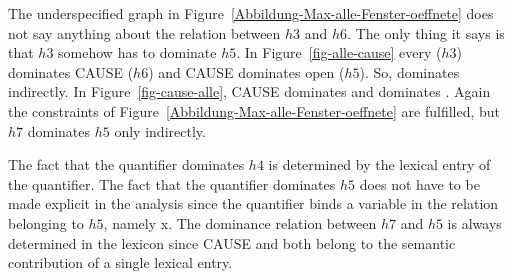 The underspecified graph in Figure~\ref{Abbildung-Max-alle-Fenster-oeffnete} does not say anything
about the relation between $h3$ and $h6$. The only thing it says is that $h3$ somehow has to dominate
$h5$. In Figure~\ref{fig-alle-cause} every ($h3$) dominates CAUSE ($h6$) and CAUSE dominates open
($h5$). So,  dominates  indirectly. In Figure~\ref{fig-cause-alle}, CAUSE
dominates  and  dominates . Again the constraints of
Figure~\ref{Abbildung-Max-alle-Fenster-oeffnete} are fulfilled, but $h7$ dominates $h5$ only indirectly.

The fact that the quantifier dominates $h4$ is determined by the lexical entry of the quantifier. The fact that
the quantifier dominates $h5$ does not have to be made explicit in the analysis since the quantifier binds a variable
in the relation belonging to $h5$, namely x. The dominance relation between $h7$ and $h5$ is always determined in the lexicon
since CAUSE and   both belong to the semantic contribution of a single lexical entry.

